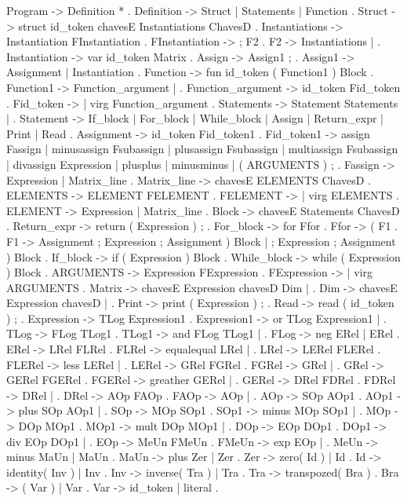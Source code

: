 Program ->   Definition * .
Definition ->    Struct |   Statements |   Function .
Struct ->    struct id_token chavesE Instantiations ChavesD .
Instantiations -> Instantiation FInstantiation .
FInstantiation -> ; F2 .
F2 -> Instantiations | \epsilon.
Instantiation -> var id_token Matrix .
Assign ->    Assign1 ; .
Assign1 ->   Assignment |   Instantiation .
Function ->  fun id_token ( Function1 ) Block .
Function1 -> Function_argument |   \epsilon .
Function_argument -> id_token Fid_token .
Fid_token -> \epsilon |   virg Function_argument .
Statements -> Statement Statements | \epsilon .
Statement -> If_block | For_block |   While_block |   Assign |   Return_expr |   Print |   Read .
Assignment ->    id_token Fid_token1 .
Fid_token1 ->    assign Fassign |   minusassign Fsubassign |   plusassign Fsubassign |   multiassign Fsubassign |   divassign Expression |   plusplus |   minusminus | ( ARGUMENTS ) ; .
Fassign ->   Expression |   Matrix_line .
Matrix_line ->   chavesE ELEMENTS ChavesD .
ELEMENTS ->  ELEMENT FELEMENT .
FELEMENT ->  \epsilon |   virg ELEMENTS .
ELEMENT ->   Expression |   Matrix_line .
Block -> chavesE Statements ChavesD .
Return_expr ->   return ( Expression ) ; .
For_block -> for Ffor .
Ffor ->  ( F1 .
F1 ->    Assignment ; Expression ; Assignment ) Block |   \epsilon ; Expression ; Assignment ) Block .
If_block ->  if ( Expression ) Block .
While_block ->   while ( Expression ) Block .
ARGUMENTS -> Expression FExpression .
FExpression -> \epsilon |   virg ARGUMENTS .
Matrix ->    chavesE Expression chavesD Dim | \epsilon.
Dim ->   chavesE Expression chavesD |   \epsilon .
Print -> print ( Expression ) ; .
Read ->  read ( id_token ) ; .
Expression ->    TLog Expression1 .
Expression1 ->   or TLog Expression1 | \epsilon    .
TLog ->  FLog TLog1 .
TLog1 -> and FLog TLog1 | \epsilon    .
FLog ->  neg ERel |   ERel .
ERel ->  LRel FLRel .
FLRel -> equalequal LRel | \epsilon    .
LRel ->  LERel FLERel .
FLERel ->    less LERel | \epsilon    .
LERel -> GRel FGRel .
FGRel -> \leq GRel | \epsilon    .
GRel ->  GERel FGERel .
FGERel ->    greather GERel | \epsilon    .
GERel -> DRel FDRel .
FDRel -> \geq DRel | \epsilon    .
DRel ->  AOp FAOp .
FAOp ->  \neq AOp | \epsilon    .
AOp ->   SOp AOp1 .
AOp1 ->  plus SOp AOp1 | \epsilon    .
SOp ->   MOp SOp1 .
SOp1 ->  minus MOp SOp1 | \epsilon    .
MOp ->   DOp MOp1 .
MOp1 ->  mult DOp MOp1 | \epsilon    .
DOp ->   EOp DOp1 .
DOp1 ->  div EOp DOp1 | \epsilon    .
EOp ->   MeUn FMeUn .
FMeUn -> exp EOp | \epsilon    .
MeUn ->  minus MaUn |   MaUn .
MaUn ->  plus Zer |   Zer .
Zer ->   zero( Id ) |   Id .
Id ->    identity( Inv ) |   Inv .
Inv ->   inverse( Tra ) |   Tra .
Tra ->   transpozed( Bra ) .
Bra ->   ( Var ) | Var .
Var ->   id_token | literal .